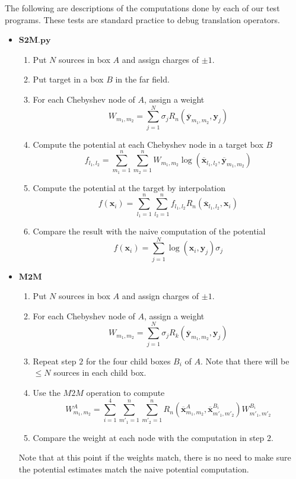 \documentclass[11pt, oneside]{article}   	%
\begin{document}
\begin{appendices}
The following are descriptions of the computations done by each of our test programs. These tests are standard practice to debug translation operators.
\begin{itemize}
\item $\mathbf{S2M.py}$
\begin{enumerate}
\item Put $N$ sources in box $A$ and assign charges of $\pm 1$.
\item Put target in a box $B$ in the far field.
\item For each Chebyshev node of $A$, assign a weight\\
$$W_{m_1,m_2}=\sum_{j=1}^N \sigma_j R_n(\mathbf{\overline{y}}_{m_1,m_2},\mathbf{y}_j)$$
\item Compute the potential at each Chebyshev node in a target box $B$\\
$$f_{l_1,l_2}=\sum_{m_1=1}^n\sum_{m_2=1}^n W_{m_1,m_2} \log(\mathbf{\overline{x}}_{l_1,l_2},\mathbf{\overline{y}}_{m_1,m_2})$$
\item Compute the potential at the target by interpolation\\
$$f(\mathbf{x}_i)=\sum_{l_1=1}^n\sum_{l_2=1}^n f_{l_1,l_2} R_n(\mathbf{\overline{x}}_{l_1,l_2},\mathbf{x}_i)$$
\item Compare the result with the naive computation of the potential\\
$$f(\mathbf{x}_i)=\sum_{j=1}^N \log(\mathbf{x}_i,\mathbf{y}_j) \sigma_j$$
\end{enumerate}

\item $\mathbf{M2M}$
\begin{enumerate}
\item Put $N$ sources in box $A$ and assign charges of $\pm 1$.
\item For each Chebyshev node of $A$, assign a weight\\
$$W_{m_1,m_2}=\sum_{j=1}^N \sigma_jR_k(\mathbf{\overline{y}}_{m_1,m_2},\mathbf{y}_j)$$
\item Repeat step $2$ for the four child boxes $B_i$ of $A$. Note that there will be $\le N$ sources in each child box.
\item Use the $M2M$ operation to compute\\
$$W^A_{m_1,m_2}= \sum_{i=1}^4\sum_{m'_1=1}^n\sum_{m'_2=1}^n R_n(\mathbf{\overline{x}}^{A}_{m_1,m_2},\mathbf{\overline{x}}^{B_i}_{m'_1,m'_2})W^{B_i}_{m'_1,m'_2}$$
\item Compare the weight at each node with the computation in step $2$.
\end{enumerate}
Note that at this point if the weights match, there is no need to make sure the potential estimates match the naive potential computation.\\


\end{itemize}
\end{appendices}
\end{document}
